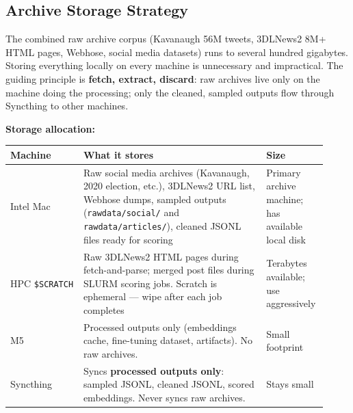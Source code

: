 \documentclass[11pt]{article}
\begin{document}
\subsection*{Archive Storage Strategy}

The combined raw archive corpus (Kavanaugh 56M tweets, 3DLNews2 8M+ HTML pages,
Webhose, social media datasets) runs to several hundred gigabytes. Storing
everything locally on every machine is unnecessary and impractical. The guiding
principle is \textbf{fetch, extract, discard}: raw archives live only on the
machine doing the processing; only the cleaned, sampled outputs flow through
Syncthing to other machines.

\medskip
\noindent\textbf{Storage allocation:}

\begin{center}
\begin{tabular}{p{0.22\linewidth}p{0.55\linewidth}p{0.15\linewidth}}
\toprule
\textbf{Machine} & \textbf{What it stores} & \textbf{Size} \\
\midrule
Intel Mac & Raw social media archives (Kavanaugh, 2020 election, etc.),
            3DLNews2 URL list, Webhose dumps, sampled outputs
            (\texttt{rawdata/social/} and \texttt{rawdata/articles/}),
            cleaned JSONL files ready for scoring &
            Primary archive machine; has available local disk \\
HPC \texttt{\$SCRATCH} & Raw 3DLNews2 HTML pages during fetch-and-parse;
            merged post files during SLURM scoring jobs.
            Scratch is ephemeral --- wipe after each job completes &
            Terabytes available; use aggressively \\
M5 & Processed outputs only (embeddings cache, fine-tuning dataset,
     artifacts). No raw archives. & Small footprint \\
Syncthing & Syncs \textbf{processed outputs only}: sampled JSONL,
            cleaned JSONL, scored embeddings. Never syncs raw archives. &
            Stays small \\
\bottomrule
\end{tabular}
\end{center}
\end{document}
